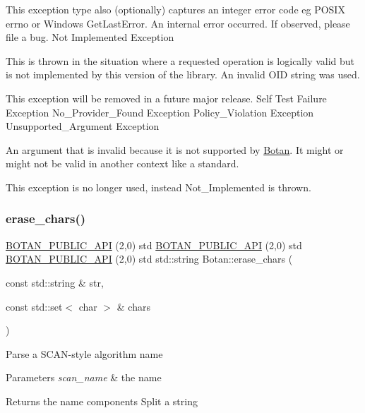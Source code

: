This exception type also (optionally) captures an integer error code eg P\+O\+S\+IX errno or Windows Get\+Last\+Error. An internal error occurred. If observed, please file a bug. Not Implemented Exception

This is thrown in the situation where a requested operation is logically valid but is not implemented by this version of the library. An invalid O\+ID string was used.

This exception will be removed in a future major release. Self Test Failure Exception No\+\_\+\+Provider\+\_\+\+Found Exception Policy\+\_\+\+Violation Exception Unsupported\+\_\+\+Argument Exception

An argument that is invalid because it is not supported by \hyperlink{namespace_botan}{Botan}. It might or might not be valid in another context like a standard.

This exception is no longer used, instead Not\+\_\+\+Implemented is thrown. \mbox{\label{namespace_botan_a1e86875d4abdb177fbdcd7b30a2b62da}} 
\subsubsection{\texorpdfstring{erase\+\_\+chars()}{erase\_chars()}}
{\footnotesize\ttfamily \hyperlink{namespace_botan_a6b9388030d872e586a4655b776ac9501}{B\+O\+T\+A\+N\+\_\+\+P\+U\+B\+L\+I\+C\+\_\+\+A\+PI} (2,0) std \hyperlink{namespace_botan_a6b9388030d872e586a4655b776ac9501}{B\+O\+T\+A\+N\+\_\+\+P\+U\+B\+L\+I\+C\+\_\+\+A\+PI} (2,0) std \hyperlink{namespace_botan_a6b9388030d872e586a4655b776ac9501}{B\+O\+T\+A\+N\+\_\+\+P\+U\+B\+L\+I\+C\+\_\+\+A\+PI} (2,0) std std\+::string Botan\+::erase\+\_\+chars (\begin{DoxyParamCaption}\item[{const std\+::string \&}]{str,  }\item[{const std\+::set$<$ char $>$ \&}]{chars }\end{DoxyParamCaption})}

Parse a S\+C\+A\+N-\/style algorithm name 
\begin{DoxyParams}{Parameters}
{\em scan\+\_\+name} & the name \\
\hline
\end{DoxyParams}
\begin{DoxyReturn}{Returns}
the name components Split a string 
\end{DoxyReturn}

